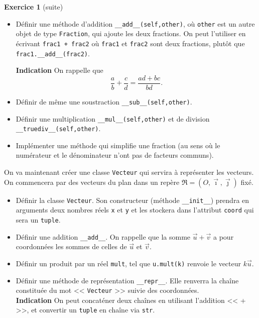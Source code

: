 \begin{frame}[fragile]
	\begin{block}{\textbf{Exercice 1} (suite)}
		\begin{itemize}
			\item Définir une méthode d'addition \lstinline|__add__(self,other)|, où \lstinline|other| est un autre objet de type \lstinline|Fraction|, qui ajoute les deux fractions. On peut l'utiliser en écrivant \lstinline|frac1 + frac2| où \lstinline|frac1| et \lstinline|frac2| sont deux fractions, plutôt que \lstinline|frac1.__add__(frac2)|.\pause

			\textbf{Indication} On rappelle que
			\[
			\frac a b + \frac c d = \frac{ad + bc}{bd}.
			\]\pause
			\item Définir de même une soustraction \lstinline|__sub__(self,other)|.\pause
			\item Définir une multiplication \lstinline|__mul__(self,other)| et de division \lstinline|__truediv__(self,other)|.
			\item Implémenter une méthode qui simplifie une fraction (au sens où le numérateur et le dénominateur n'ont pas de facteurs communs).
		\end{itemize}
	\end{block}
\end{frame}

\begin{frame}[fragile]
	\begin{exo}[Vecteurs]
		On va maintenant créer une classe \lstinline|Vecteur| qui servira à représenter les vecteurs. On commencera par des vecteurs du plan dans un repère $\mathfrak{R}=(O,\vec{\imath},\vec{\jmath})$ fixé.
		
		\begin{itemize}
			\item Définir la classe \lstinline|Vecteur|. Son constructeur (méthode \lstinline|__init__|) prendra en arguments deux nombres réels \lstinline|x| et \lstinline|y| et les stockera dans l'attribut \lstinline|coord| qui sera un \lstinline|tuple|.\pause
			\item Définir une addition \lstinline|__add__|. On rappelle que la somme $\vec u + \vec v$ a pour coordonnées les sommes de celles de $\vec u$ et $\vec v$.\pause
			\item Définir un produit par un réel \lstinline|mult|, tel que \lstinline|u.mult(k)| renvoie le vecteur $k\vec{u}$.\pause
			\item Définir une méthode de représentation \lstinline|__repr__|. Elle renverra la chaîne constituée du mot << \lstinline|Vecteur| >> suivie des coordonnées.\\\pause
			\textbf{Indication} On peut concaténer deux chaînes en utilisant l'addition << + >>, et convertir un \lstinline|tuple| en chaîne via \lstinline|str|.
		\end{itemize}
	\end{exo}
\end{frame}


